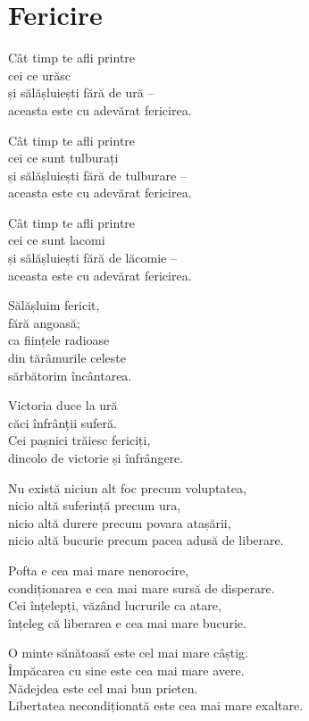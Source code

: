 
\chapter{Fericire}


Cât timp te afli printre\\
cei ce urăsc\\
și sălășluiești fără de ură –\\
aceasta este cu adevărat fericirea.


Cât timp te afli printre\\
cei ce sunt tulburați\\
și sălășluiești fără de tulburare –\\
aceasta este cu adevărat fericirea.


Cât timp te afli printre\\
cei ce sunt lacomi\\
și sălășluiești fără de lăcomie –\\
aceasta este cu adevărat fericirea.


Sălășluim fericit,\\
fără angoasă;\\
ca ființele radioase\\
din tărâmurile celeste\\
sărbătorim încântarea.


Victoria duce la ură\\
căci înfrânții suferă.\\
Cei pașnici trăiesc fericiți,\\
dincolo de victorie și înfrângere.


Nu există niciun alt foc precum voluptatea,\\
nicio altă suferință precum ura,\\
nicio altă durere precum povara atașării,\\
nicio altă bucurie precum pacea adusă de liberare.


Pofta e cea mai mare nenorocire,\\
condiționarea e cea mai mare sursă de disperare.\\
Cei înțelepți, văzând lucrurile ca atare,\\
înțeleg că liberarea e cea mai mare bucurie.

O minte sănătoasă este cel mai mare câștig.\\
Împăcarea cu sine este cea mai mare avere.\\
Nădejdea este cel mai bun prieten.\\
Libertatea necondiționată este cea mai mare exaltare.


